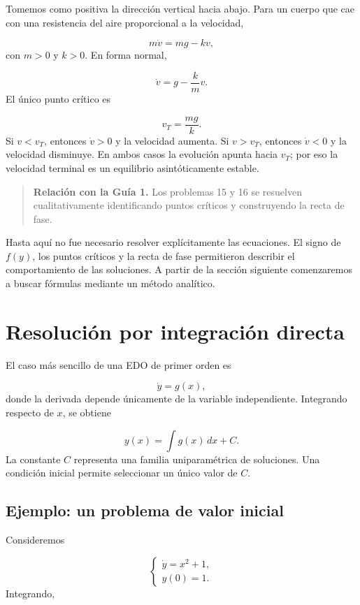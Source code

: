\documentclass[12pt,a4paper]{article}
\begin{document}
	Tomemos como positiva la dirección vertical hacia abajo. Para un cuerpo que cae con una resistencia del aire proporcional a la velocidad,

	\[
	m\dot{v}=mg-kv,
	\]
con \(m>0\) y \(k>0\). En forma normal,

	\[
	\dot{v}=g-\frac{k}{m}v.
	\]
El único punto crítico es

	\[
	v_T=\frac{mg}{k}.
	\]
Si \(v<v_T\), entonces \(\dot{v}>0\) y la velocidad aumenta. Si \(v>v_T\), entonces \(\dot{v}<0\) y la velocidad disminuye. En ambos casos la evolución apunta hacia \(v_T\); por eso la velocidad terminal es un equilibrio asintóticamente estable.

	\begin{quote}
		\textbf{Relación con la Guía 1.} Los problemas 15 y 16 se resuelven cualitativamente identificando puntos críticos y construyendo la recta de fase.
	\end{quote}

	Hasta aquí no fue necesario resolver explícitamente las ecuaciones. El signo de \(f(y)\), los puntos críticos y la recta de fase permitieron describir el comportamiento de las soluciones. A partir de la sección siguiente comenzaremos a buscar fórmulas mediante un método analítico.

	\clearpage
	\section{Resolución por integración directa}

	El caso más sencillo de una EDO de primer orden es

	\[
	\dot{y}=g(x),
	\]
donde la derivada depende únicamente de la variable independiente. Integrando respecto de \(x\), se obtiene

	\[
	y(x)=\int g(x)\,dx+C.
	\]
La constante \(C\) representa una familia uniparamétrica de soluciones. Una condición inicial permite seleccionar un único valor de \(C\).

	\subsection{Ejemplo: un problema de valor inicial}

	Consideremos

	\[
	\begin{cases}
		\dot{y}=x^2+1,\\
		y(0)=1.
	\end{cases}
	\]
	Integrando,\nopagebreak[4]
\end{document}
